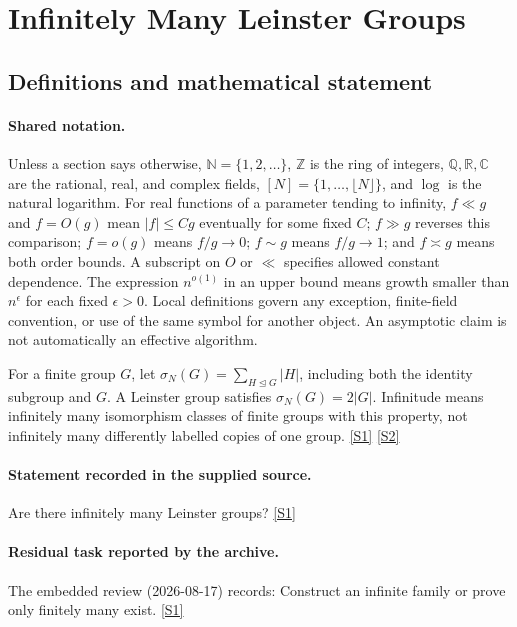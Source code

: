 \documentclass[11pt,a4paper]{article}
\newcommand{\N}{\mathbb{N}}
\newcommand{\Z}{\mathbb{Z}}
\newcommand{\Q}{\mathbb{Q}}
\newcommand{\R}{\mathbb{R}}
\newcommand{\C}{\mathbb{C}}
\newcommand{\sref}[2]{\hyperlink{source:#1:#2}{[S#2]}}
\begin{document}
\section{Infinitely Many Leinster Groups}\label{statement}


\subsection{Definitions and mathematical statement}

\paragraph{Shared notation.}Unless a section says otherwise, $\N=\{1,2,\ldots\}$,
$\Z$ is the ring of integers, $\Q,\R,\C$ are the rational, real, and complex
fields, $[N]=\{1,\ldots,\lfloor N\rfloor\}$, and $\log$ is the natural
logarithm. For real functions of a parameter tending to infinity,
$f\ll g$ and $f=O(g)$ mean $|f|\leq Cg$ eventually for some fixed $C$;
$f\gg g$ reverses this comparison; $f=o(g)$ means $f/g\to0$;
$f\sim g$ means $f/g\to1$; and $f\asymp g$ means both order bounds.
A subscript on $O$ or $\ll$ specifies allowed constant dependence.
The expression $n^{o(1)}$ in an upper bound means growth smaller than
$n^\epsilon$ for each fixed $\epsilon>0$. Local definitions govern any
exception, finite-field convention, or use of the same symbol for another
object. An asymptotic claim is not automatically an effective algorithm.



For a finite group $G$, let $\sigma_N(G)=\sum_{H\trianglelefteq G}|H|$, including both the identity subgroup and $G$. A Leinster group satisfies $\sigma_N(G)=2|G|$. Infinitude means infinitely many isomorphism classes of finite groups with this property, not infinitely many differently labelled copies of one group. \sref{statement}{1} \sref{statement}{2}

\paragraph{Statement recorded in the supplied source.}
Are there infinitely many Leinster groups? \sref{statement}{1}

\paragraph{Residual task reported by the archive.}

The embedded review (2026-08-17) records: Construct an infinite family or prove only finitely many exist. \sref{statement}{1}
\end{document}
